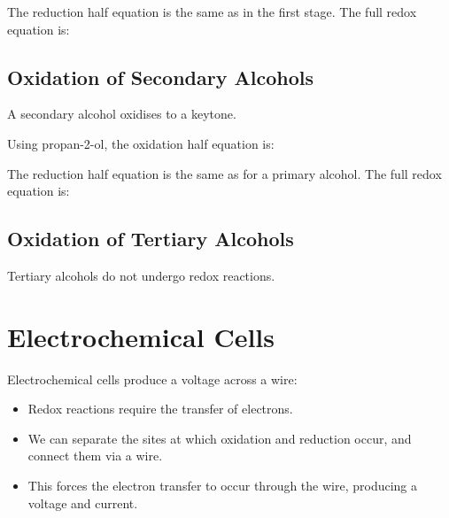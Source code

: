 \documentclass[a4paper,11pt]{article}
\begin{document}
The reduction half equation is the same as in the first stage. The full redox
equation is:

\begin{center}
\end{center}

\subsection{Oxidation of Secondary Alcohols}

A secondary alcohol oxidises to a keytone.

Using propan-2-ol, the oxidation half equation is:

\begin{center}
\end{center}

The reduction half equation is the same as for a primary alcohol. The full redox
equation is:

\begin{center}
\end{center}

\subsection{Oxidation of Tertiary Alcohols}

Tertiary alcohols do not undergo redox reactions.



\section{Electrochemical Cells}

Electrochemical cells produce a voltage across a wire:

\begin{itemize}
\item Redox reactions require the transfer of electrons.
\item We can separate the sites at which oxidation and reduction occur, and
	connect them via a wire.
\item This forces the electron transfer to occur through the wire, producing a
	voltage and current.
\end{itemize}
\end{document}
